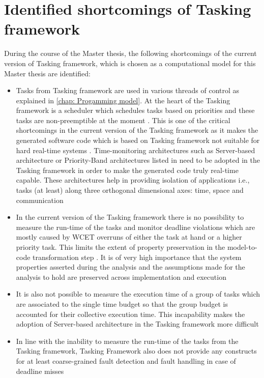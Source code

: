 \section{Identified shortcomings of Tasking framework}
During the course of the Master thesis, the following shortcomings of the current version of Tasking framework, which is chosen as a computational model for this Master thesis are identified:
\begin{itemize}
\item Tasks from Tasking framework are used in various threads of control as explained in \cref{chap: Progamming model}. At the heart of the Tasking framework is a scheduler which schedules tasks based on priorities and these tasks are non-preemptible at the moment \cite{TaskFr}. This is one of the critical shortcomings in the current version of the Tasking framework as it makes the generated software code which is based on Tasking framework not suitable for hard real-time systems \cite{TempIsolation}. Time-monitoring architectures such as Server-based architecture or Priority-Band architectures listed in \cite{TempIsolation} need to be adopted in the Tasking framework in order to make the generated code truly real-time capable. These architectures help in providing isolation of applications i.e., tasks (at least) along three orthogonal dimensional axes: time, space and communication \cite{TempIsolation}
\item In the current version of the Tasking framework there is no possibility to measure the run-time of the tasks and monitor deadline violations which are mostly caused by WCET overruns of either the task at hand or a higher priority task. This limits the extent of property preservation in the model-to-code transformation step \cite{TempIsolation}. It is of very high importance that the system properties asserted during the analysis and the assumptions made for the analysis to hold are preserved across implementation and execution \cite{EvoRAVCodeAr}\cite{TempIsolation}
\item It is also not possible to measure the execution time of a group of tasks which are associated to the single time budget so that the group budget is accounted for their collective execution time. This incapability makes the adoption of Server-based architecture in the Tasking framework more difficult \cite{TempIsolation}
\item In line with the inability to measure the run-time of the tasks from the Tasking framework, Tasking Framework also does not provide any constructs for at least coarse-grained fault detection and fault handling in case of deadline misses 
\end{itemize}

